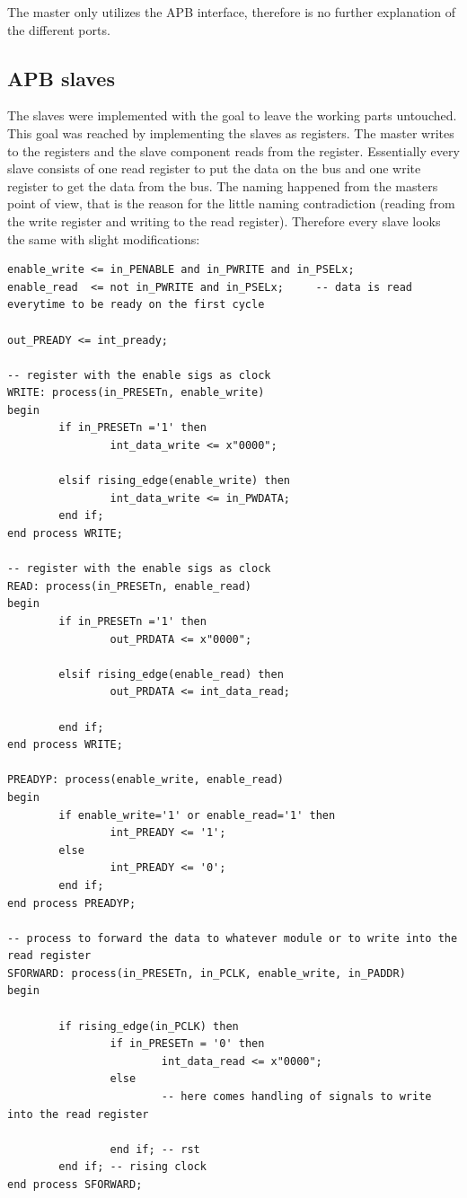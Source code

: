 \documentclass[%
	a4paper,
]
{article}
\begin{document}
The master only utilizes the APB interface, therefore is no further
explanation of the different ports.

\subsection{APB slaves}
The slaves were implemented with the goal to leave the working
parts untouched. This goal was reached by implementing the
slaves as registers. The master writes to the registers and
the slave component reads from the register. Essentially every
slave consists of one read register to put the data on the bus 
and one write register to get the data from the bus. The naming
happened from the masters point of view, that is the reason for the
little naming contradiction (reading from the write register and 
writing to the read register).
Therefore every slave looks the same with slight modifications:

\begin{lstlisting}
enable_write <= in_PENABLE and in_PWRITE and in_PSELx;
enable_read  <= not in_PWRITE and in_PSELx;     -- data is read everytime to be ready on the first cycle

out_PREADY <= int_pready;

-- register with the enable sigs as clock
WRITE: process(in_PRESETn, enable_write)
begin
        if in_PRESETn ='1' then
                int_data_write <= x"0000";

        elsif rising_edge(enable_write) then
                int_data_write <= in_PWDATA;
        end if;
end process WRITE;

-- register with the enable sigs as clock
READ: process(in_PRESETn, enable_read)
begin
        if in_PRESETn ='1' then
                out_PRDATA <= x"0000";

        elsif rising_edge(enable_read) then
                out_PRDATA <= int_data_read;

        end if;
end process WRITE;

PREADYP: process(enable_write, enable_read)
begin
        if enable_write='1' or enable_read='1' then
                int_PREADY <= '1';
        else
                int_PREADY <= '0';
        end if;
end process PREADYP;

-- process to forward the data to whatever module or to write into the read register
SFORWARD: process(in_PRESETn, in_PCLK, enable_write, in_PADDR)
begin

        if rising_edge(in_PCLK) then
                if in_PRESETn = '0' then
                        int_data_read <= x"0000";
                else
                        -- here comes handling of signals to write into the read register

                end if; -- rst
        end if; -- rising clock
end process SFORWARD;
\end{lstlisting}
\end{document}
